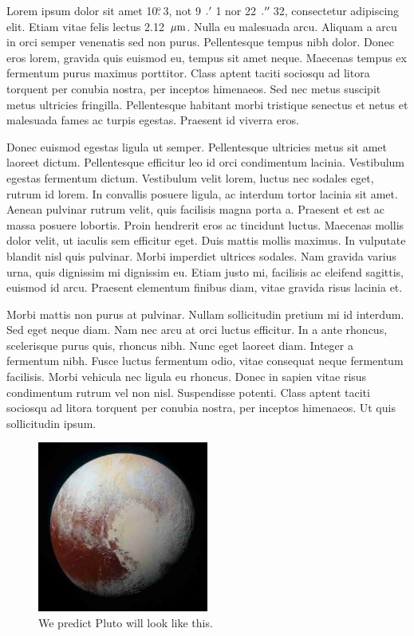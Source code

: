 \documentclass{lowell-prop}
\begin{document}

\scienceJustification


Lorem ipsum dolor sit amet 10$\mbox{$.\!\!^\circ$}$3, not 9$\farcm$1 nor 22$\farcs$32,
consectetur adipiscing elit. Etiam vitae felis lectus
2.12~$\mbox{$\mu$m}$. Nulla eu malesuada arcu. Aliquam a arcu in orci semper
venenatis sed non purus. Pellentesque tempus nibh dolor. Donec eros
lorem, gravida quis euismod eu, tempus sit amet neque. Maecenas tempus
ex fermentum purus maximus porttitor. Class aptent taciti sociosqu ad
litora torquent per conubia nostra, per inceptos himenaeos. Sed nec
metus suscipit metus ultricies fringilla. Pellentesque habitant morbi
tristique senectus et netus et malesuada fames ac turpis
egestas. Praesent id viverra eros.

Donec euismod egestas ligula ut semper. Pellentesque ultricies metus
sit amet laoreet dictum. Pellentesque efficitur leo id orci
condimentum lacinia. Vestibulum egestas fermentum dictum. Vestibulum
velit lorem, luctus nec sodales eget, rutrum id lorem. In convallis
posuere ligula, ac interdum tortor lacinia sit amet. Aenean pulvinar
rutrum velit, quis facilisis magna porta a. Praesent et est ac massa
posuere lobortis. Proin hendrerit eros ac tincidunt luctus. Maecenas
mollis dolor velit, ut iaculis sem efficitur eget. Duis mattis mollis
maximus. In vulputate blandit nisl quis pulvinar. Morbi imperdiet
ultrices sodales. Nam gravida varius urna, quis dignissim mi dignissim
eu. Etiam justo mi, facilisis ac eleifend sagittis, euismod id
arcu. Praesent elementum finibus diam, vitae gravida risus lacinia et.

Morbi mattis non purus at pulvinar. Nullam sollicitudin pretium mi id
interdum. Sed eget neque diam. Nam nec arcu at orci luctus
efficitur. In a ante rhoncus, scelerisque purus quis, rhoncus
nibh. Nunc eget laoreet diam. Integer a fermentum nibh. Fusce luctus
fermentum odio, vitae consequat neque fermentum facilisis. Morbi
vehicula nec ligula eu rhoncus. Donec in sapien vitae risus
condimentum rutrum vel non nisl. Suspendisse potenti. Class aptent
taciti sociosqu ad litora torquent per conubia nostra, per inceptos
himenaeos. Ut quis sollicitudin ipsum.

\begin{figure}[h]
  \includegraphics[width=0.5\textwidth]{pluto-small.eps} %
  \caption{We predict Pluto will look like this.}\label{fig:name}
\end{figure}
\end{document}
